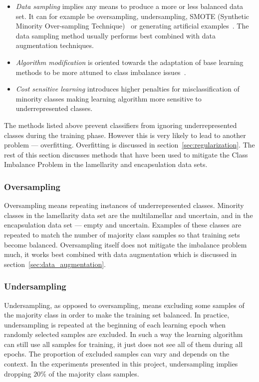 \documentclass[a4paper, 11pt, table]{article}
\begin{document}
\begin{itemize}

\item \textit{Data sampling} implies any means to produce a more or less balanced data set. It can for example be oversampling, undersampling, SMOTE (Synthetic Minority Over-sampling Technique)~\cite{smote_chawla} or generating artificial examples~\cite{ishaq_synthetic}. The data sampling method usually performs best combined with data augmentation techniques.

\item \textit{Algorithm modification} is oriented towards the adaptation of base learning methods to be more attuned to class imbalance issues~\cite{Zadrozny:2001:LMD:502512.502540}.

\item \textit{Cost sensitive learning} introduces higher penalties for misclassification of minority classes making learning algorithm more sensitive to underrepresented classes. 

\end{itemize}

The methods listed above prevent classifiers from ignoring underrepresented classes during the training phase. However this is very likely to lead to another problem --- overfitting. Overfitting is discussed in section~\ref{sec:regularization}. The rest of this section discusses methods that have been used to mitigate the Class Imbalance Problem in the lamellarity and encapsulation data sets. 


\subsubsection{Oversampling}
Oversampling means repeating instances of underrepresented classes. Minority classes in the lamellarity data set are the multilamellar and uncertain, and in the encapsulation data set --- empty and uncertain. Examples of these classes are repeated to match the number of majority class samples so that training sets become balanced. Oversampling itself does not mitigate the imbalance problem much, it works best combined with data augmentation which is discussed in section~\ref{sec:data_augmentation}.

\subsubsection{Undersampling}
Undersampling, as opposed to oversampling, means excluding some samples of the majority class in order to make the training set balanced. In practice, undersampling is repeated at the beginning of each learning epoch when randomly selected samples are excluded. In such a way the learning algorithm can still use all samples for training, it just does not see all of them during all epochs. The proportion of excluded samples can vary and depends on the context. In the experiments presented in this project, undersampling implies dropping $20\%$ of the majority class samples. 
\end{document}
